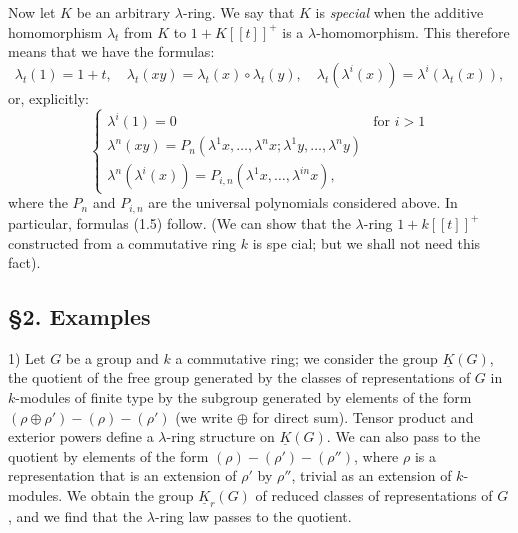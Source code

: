 Now let $K$ be an arbitrary $\lambda$-ring. We say that $K$ is \emph{special} when the additive homomorphism $\lambda_t$ from $K$ to $1+K[[t]]^+$ is a $\lambda$-homomorphism. This therefore means that we have the formulas:
\begin{equation}\tag{1.10}
\lambda_t(1)=1+t,\quad
\lambda_t(xy)=\lambda_t(x)\circ\lambda_t(y),\quad
\lambda_t(\lambda^i(x))=\lambda^i(\lambda_t(x)),
\end{equation}
or, explicitly:
\begin{equation}\tag{1.11}
\begin{cases}
\lambda^i(1)=0 & \text{for }i>1\\
\lambda^n(xy)=P_n(\lambda^1x,\ldots,\lambda^n x;\lambda^1y,\ldots,\lambda^n y)\\
\lambda^n(\lambda^i(x))=P_{i,n}(\lambda^1x,\ldots,\lambda^{in} x),
\end{cases}
\end{equation}
where the $P_n$ and $P_{i,n}$ are the universal polynomials considered above. In particular, formulas (1.5) follow. (We can show that the $\lambda$-ring $1+k[[t]]^+$ constructed from a commutative ring $k$ is spe%
%
cial; but we shall not need this fact).

\subsection*{\S 2. Examples}

1) Let $G$ be a group and $k$ a commutative ring; we consider the group $\underline{K}(G)$, the quotient of the free group generated by the classes of representations of $G$ in $k$-modules of finite type by the subgroup generated by elements of the form $(\rho\oplus\rho')-(\rho)-(\rho')$ (we write $\oplus$ for direct sum). Tensor product and exterior powers define a $\lambda$-ring structure on $\underline{K}(G)$. We can also pass to the quotient by elements of the form $(\rho)-(\rho')-(\rho'')$, where $\rho$ is a representation that is an extension of $\rho'$ by $\rho''$, trivial as an extension of $k$-modules. We obtain the group $\underline{K}_r(G)$ of reduced classes of representations of $G$, and we find that the $\lambda$-ring law passes to the quotient.

